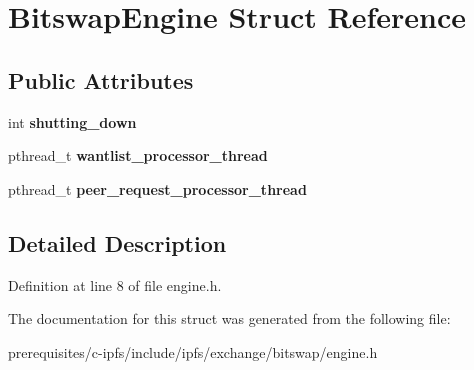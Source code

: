 \hypertarget{struct_bitswap_engine}{}\section{Bitswap\+Engine Struct Reference}
\label{struct_bitswap_engine}
\subsection*{Public Attributes}
\begin{DoxyCompactItemize}
\item 
\mbox{\label{struct_bitswap_engine_a9657607344bc937c142656612d5b595d}} 
int {\bfseries shutting\+\_\+down}
\item 
\mbox{\label{struct_bitswap_engine_ab772c220d6f0b68c18fc90042b77291e}} 
pthread\+\_\+t {\bfseries wantlist\+\_\+processor\+\_\+thread}
\item 
\mbox{\label{struct_bitswap_engine_a28299eea810ef6432f7b85ea3dc0d380}} 
pthread\+\_\+t {\bfseries peer\+\_\+request\+\_\+processor\+\_\+thread}
\end{DoxyCompactItemize}


\subsection{Detailed Description}


Definition at line 8 of file engine.\+h.



The documentation for this struct was generated from the following file\+:\begin{DoxyCompactItemize}
\item 
prerequisites/c-\/ipfs/include/ipfs/exchange/bitswap/engine.\+h\end{DoxyCompactItemize}
